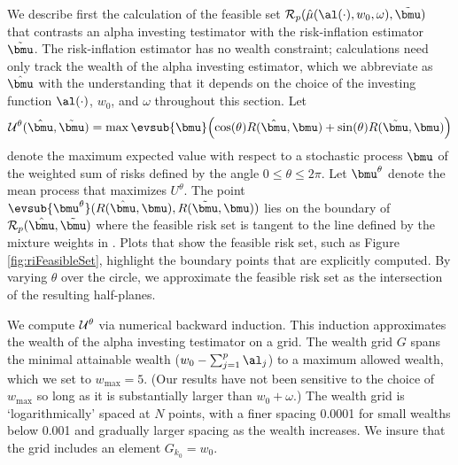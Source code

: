 \documentclass[12pt]{article}
\begin{document}
 We describe first the calculation of the feasible set ${\cal R}_p(\hat\mu(
 \al(\cdot), w_0, \omega), \tilde{\bmu})$ that contrasts an alpha investing
 testimator with the risk-inflation estimator $\tilde{\bmu}$.  The
 risk-inflation estimator has no wealth constraint; calculations need only track
 the wealth of the alpha investing estimator, which we abbreviate as
 $\hat{\bmu}$ with the understanding that it depends on the choice of the
 investing function $\al(\cdot)$, $w_0$, and $\omega$ throughout this section.
  Let
 \begin{equation}
   {\cal U}^\theta(\hat{\bmu},\tilde{\bmu}) = 
       \max \evsub{\bmu} \Bigl(
       \cos(\theta) R(\hat{\bmu}, \bmu) + \sin(\theta) R(\tilde{\bmu},\bmu) 
       \Bigr)
 \label{eq:U}
 \end{equation}
 denote the maximum expected value with respect to a stochastic process $\bmu$
 of the weighted sum of risks defined by the angle $ 0 \le \theta \le 2 \pi$.
  Let $\bmu^\theta$ denote the mean process that maximizes $U^\theta$.  The
 point $\evsub{\bmu^\theta}(R(\hat{\bmu}, \bmu), R(\tilde{\bmu}, \bmu))$ lies on
 the boundary of ${\cal R}_p(\hat{\bmu},\tilde{\bmu})$ where the feasible risk
 set is tangent to the line defined by the mixture weights in .  Plots
 that show the feasible risk set, such as Figure \ref{fig:riFeasibleSet},
 highlight the boundary points that are explicitly computed.  By varying
 $\theta$ over the circle, we approximate the feasible risk set as the
 intersection of the resulting half-planes.

 
 We compute ${\cal U}^\theta$ via numerical backward induction.  This induction
 approximates the wealth of the alpha investing testimator on a grid.  The
 wealth grid $G$ spans the minimal attainable wealth ($w_0 - \sum_{j=1}^p
 \al_j$) to a maximum allowed wealth, which we set to $w_{\max} = 5$.  (Our
 results have not been sensitive to the choice of $w_{\max}$ so long as it is
 substantially larger than $w_0 + \omega$.)  The wealth grid is
 `logarithmically' spaced at $N$ points, with a finer spacing 0.0001 for small
 wealths below 0.001 and gradually larger spacing as the wealth increases.  We
 insure that the grid includes an element $G_{k_0} = w_0$.
\end{document}
